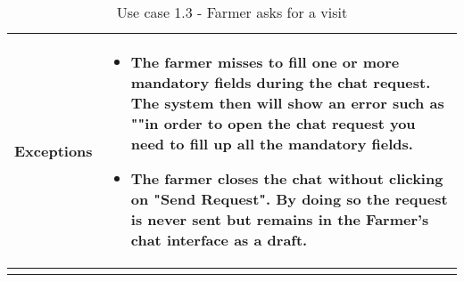 \begin{longtable}[H]{ | l | p{10cm} | }
\\ \hline
{\cellcolor[rgb]{0.753,0.753,0.753}}\textbf{Exceptions} &
\begin{itemize}
    \item The farmer misses to fill one or more mandatory fields during the chat request. The system then will show an error such as ""in order to open the chat request you need to fill up all the mandatory fields.
    \item The farmer closes the chat without clicking on "Send Request". By doing so the request is never sent but remains in the Farmer’s chat interface as a draft.
\end{itemize}
\\ \hline
\caption{Use case 1.3 - Farmer asks for a visit}
\\
\end{longtable}